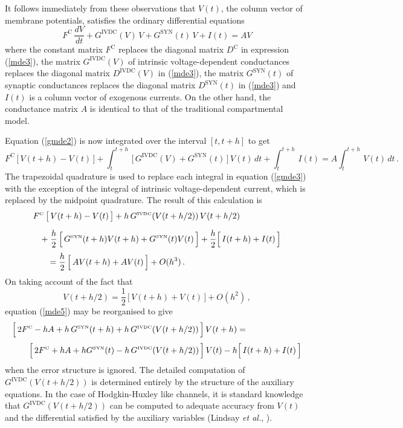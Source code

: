 It follows immediately from these observations that $V(t)$, the
column vector of membrane potentials, satisfies the ordinary
differential equations
\begin{equation}\label{gmde2}
F^\mathrm{C}\,\frac{dV}{dt}+G^\mathrm{IVDC}(V)\,V+G^\mathrm{SYN}(t)\,V
+I(t)=AV
\end{equation}
where the constant matrix $F^\mathrm{C}$ replaces the diagonal
matrix $D^\mathrm{C}$ in expression (\ref{mde3}), the matrix
$G^\mathrm{IVDC}(V)$ of intrinsic voltage-dependent conductances
replaces the diagonal matrix $D^\mathrm{IVDC}(V)$ in (\ref{mde3}),
the matrix $G^\mathrm{SYN}(t)$ of synaptic conductances replaces
the diagonal matrix $D^\mathrm{SYN}(t)$ in (\ref{mde3}) and $I(t)$
is a column vector of exogenous currents. On the other hand, the
conductance matrix $A$ is identical to that of the traditional
compartmental model.

Equation (\ref{gmde2}) is now integrated over the interval
$[t,t+h]$ to get
\begin{equation}\label{gmde3}
F^\mathrm{C}\,\big[\,V(t+h)-V(t)\,\big]+
\int_t^{t+h}\,\big[\,G^\mathrm{IVDC}(V)+
G^\mathrm{SYN}(t)\,\big]\,V(t)\,dt
+\int_t^{t+h}\,I(t)=A\int_t^{t+h}\,V(t)\,dt\,.
\end{equation}
The trapezoidal quadrature is used to replace each integral in
equation (\ref{gmde3}) with the exception of the integral of
intrinsic voltage-dependent current, which is replaced by the
midpoint quadrature. The result of this calculation is
\begin{equation}\label{gmde4}
\begin{array}{l}
\displaystyle F^{\mbox{\tiny C}}\,\big[\,V(t+h)-V(t)\,\big]+
h\,G^{\mbox{\tiny IVDC}}(V(t+h/2))\,V(t+h/2)\\[10pt]
\quad\displaystyle+\;\frac{h}{2}\,\Big[\,G^{\mbox{\tiny SYN}}(t+h)V(t+h)
+G^{\mbox{\tiny SYN}}(t)V(t)\,\Big]+\frac{h}{2}
\Big[\,I(t+h)+I(t)\,\Big]\\[10pt]
\qquad\displaystyle= \frac{h}{2}\,\Big[\,A V(t+h)+AV(t)\,\Big]+O(h^3)\,.
\end{array}
\end{equation}
On taking account of the fact that
\[
V(t+h/2)=\frac{1}{2} \,\Big[\,V(t+h)+V(t)\,\Big]+O(h^2)\,,
\]
equation (\ref{mde5}) may be reorganised to give
\begin{equation}\label{mde6}
\begin{array}{l}
\displaystyle\Big[\,2 F^{\mbox{\tiny C}}-hA+h\,G^{\mbox{\tiny SYN}}(t+h)
+h\,G^{\mbox{\tiny IVDC}}(V(t+h/2))\,\Big]\,V(t+h) = \\[10pt]
\qquad\displaystyle\Big[\,2 F^{\mbox{\tiny C}}+hA+h G^{\mbox{\tiny SYN}}(t)
-h\,G^{\mbox{\tiny IVDC}}(V(t+h/2))\,\Big]\,V(t)
-h\Big[\,I(t+h)+I(t)\,\Big]
\end{array}
\end{equation}
when the error structure is ignored. The detailed computation of
$G^\mathrm{IVDC}(V(t+h/2))$ is determined entirely by the
structure of the auxiliary equations. In the case of
Hodgkin-Huxley like channels, it is standard knowledge that
$G^\mathrm{IVDC}(V(t+h/2))$ can be computed to adequate accuracy
from $V(t)$ and the differential satisfied by the auxiliary
variables (Lindsay \emph{et al.}, \cite{Lindsay01a}).

